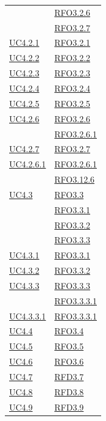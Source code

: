 \begin{itemize}
\begin{itemize}
\begin{itemize}
\begin{itemize}
\begin{longtable}{|>{\centering}m{5cm}|m{5cm}<{\centering}|}
& \hyperlink{RFO3.2.6}{RFO3.2.6}\\
& \hyperlink{RFO3.2.7}{RFO3.2.7}\\ \hline
\hyperref[UC4.2.1]{UC4.2.1} & \hyperlink{RFO3.2.1}{RFO3.2.1}\\ \hline
\hyperref[UC4.2.2]{UC4.2.2} & \hyperlink{RFO3.2.2}{RFO3.2.2}\\ \hline
\hyperref[UC4.2.3]{UC4.2.3} & \hyperlink{RFO3.2.3}{RFO3.2.3}\\ \hline
\hyperref[UC4.2.4]{UC4.2.4} & \hyperlink{RFO3.2.4}{RFO3.2.4}\\ \hline
\hyperref[UC4.2.5]{UC4.2.5} & \hyperlink{RFO3.2.5}{RFO3.2.5}\\ \hline
\hyperref[UC4.2.6]{UC4.2.6} & \hyperlink{RFO3.2.6}{RFO3.2.6}\\
& \hyperlink{RFO3.2.6.1}{RFO3.2.6.1}\\ \hline
\hyperref[UC4.2.7]{UC4.2.7} & \hyperlink{RFO3.2.7}{RFO3.2.7}\\ \hline
\hyperref[UC4.2.6.1]{UC4.2.6.1} & \hyperlink{RFO3.2.6.1}{RFO3.2.6.1}\\ & \hyperlink{RFO3.12.6}{RFO3.12.6}\\ \hline
\hyperref[UC4.3]{UC4.3} & \hyperlink{RFO3.3}{RFO3.3}\\
& \hyperlink{RFO3.3.1}{RFO3.3.1}\\
& \hyperlink{RFO3.3.2}{RFO3.3.2}\\
& \hyperlink{RFO3.3.3}{RFO3.3.3}\\ \hline
\hyperref[UC4.3.1]{UC4.3.1} & \hyperlink{RFO3.3.1}{RFO3.3.1}\\ \hline
\hyperref[UC4.3.2]{UC4.3.2} & \hyperlink{RFO3.3.2}{RFO3.3.2}\\ \hline
\hyperref[UC4.3.3]{UC4.3.3} & \hyperlink{RFO3.3.3}{RFO3.3.3}\\
& \hyperlink{RFO3.3.3.1}{RFO3.3.3.1}\\ \hline
\hyperref[UC4.3.3.1]{UC4.3.3.1} & \hyperlink{RFO3.3.3.1}{RFO3.3.3.1}\\ \hline
\hyperref[UC4.4]{UC4.4} & \hyperlink{RFO3.4}{RFO3.4}\\ \hline
\hyperref[UC4.5]{UC4.5} & \hyperlink{RFO3.5}{RFO3.5}\\ \hline
\hyperref[UC4.6]{UC4.6} & \hyperlink{RFO3.6}{RFO3.6}\\ \hline
\hyperref[UC4.7]{UC4.7} & \hyperlink{RFD3.7}{RFD3.7}\\ \hline
\hyperref[UC4.8]{UC4.8} & \hyperlink{RFD3.8}{RFD3.8}\\ \hline
\hyperref[UC4.9]{UC4.9} & \hyperlink{RFD3.9}{RFD3.9}\\ \hline

\end{longtable}
\end{itemize}
\end{itemize}
\end{itemize}
\end{itemize}
